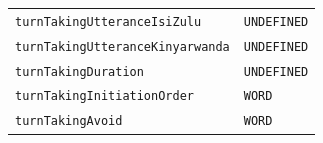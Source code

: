 \documentclass{CSSRforAfrica}
\begin{document}
\begin{table}[H]
\begin{tabular}{l l}
{\footnotesize \verb+turnTakingUtteranceIsiZulu+}                           & {\footnotesize \verb+UNDEFINED+} \vspace{-1.5mm} \\
{\footnotesize \verb+turnTakingUtteranceKinyarwanda+}                 & {\footnotesize \verb+UNDEFINED+} \vspace{-1.5mm} \\
{\footnotesize \verb+turnTakingDuration+}                                     & {\footnotesize \verb+UNDEFINED+} \vspace{-1.5mm} \\
{\footnotesize \verb+turnTakingInitiationOrder+}                             & {\footnotesize \verb+WORD+} \vspace{-1.5mm} \\
{\footnotesize \verb+turnTakingAvoid+}                                           & {\footnotesize \verb+WORD+} \vspace{-1.5mm}  \\
\end{tabular}
\end{table}
\end{document}
